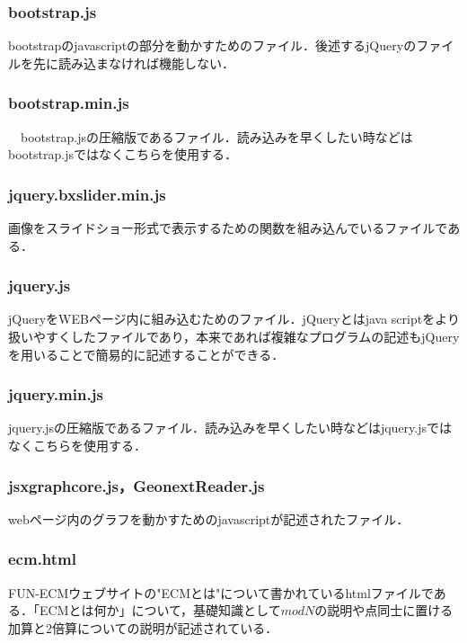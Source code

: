\documentclass[openany,11pt,papersize]{jsbook}
\begin{document}
\subsubsection{bootstrap.js}
bootstrapのjavascriptの部分を動かすためのファイル．後述するjQueryのファイルを先に読み込まなければ機能しない．

\subsubsection{bootstrap.min.js}
　bootstrap.jsの圧縮版であるファイル．読み込みを早くしたい時などはbootstrap.jsではなくこちらを使用する．

\subsubsection{jquery.bxslider.min.js}
画像をスライドショー形式で表示するための関数を組み込んでいるファイルである．

\subsubsection{jquery.js}
jQueryをWEBページ内に組み込むためのファイル．jQueryとはjava scriptをより扱いやすくしたファイルであり，本来であれば複雑なプログラムの記述もjQueryを用いることで簡易的に記述することができる．

\subsubsection{jquery.min.js}
jquery.jsの圧縮版であるファイル．読み込みを早くしたい時などはjquery.jsではなくこちらを使用する．

\subsubsection{jsxgraphcore.js，GeonextReader.js}
webページ内のグラフを動かすためのjavascriptが記述されたファイル．

\subsubsection{ecm.html}
FUN-ECMウェブサイトの"ECMとは"について書かれているhtmlファイルである．「ECMとは何か」について，基礎知識として$modN$の説明や点同士に置ける加算と2倍算についての説明が記述されている．
\end{document}
